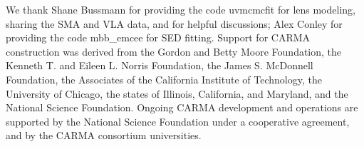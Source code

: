 \documentclass[twocolumn,apj,numberedappendix]{emulateapj}
\begin{document}
\acknowledgments
We thank Shane Bussmann for providing the code {\sc uvmcmcfit} for lens modeling, sharing the SMA and VLA data, and for helpful discussions; Alex Conley for providing the code {\sc mbb\_emcee} for SED fitting. 
Support for CARMA construction was derived from the
Gordon and Betty Moore Foundation, the Kenneth T. and Eileen
L. Norris Foundation, the James S. McDonnell Foundation, the
Associates of the California Institute of Technology, the University
of Chicago, the states of Illinois, California, and Maryland,
and the National Science Foundation. 
Ongoing CARMA development
and operations are supported by the National Science
Foundation under a cooperative agreement, and by the CARMA
consortium universities.
\newpage

%
\end{document}
